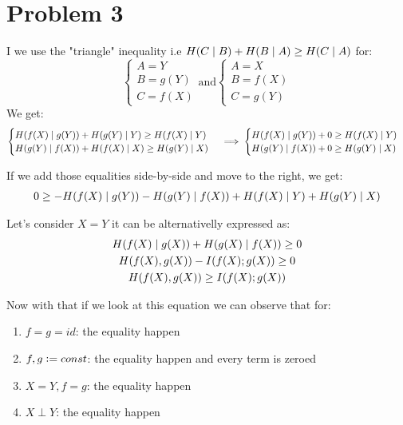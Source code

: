 

\section{Problem 3}


I we use the "triangle" inequality i.e $\pre{C}[B] + \pre{B}[A] \geq \pre{C}[A]$ for:
\begin{equation}
\begin{cases}
    A=Y\\
    B=g(Y)\\
    C=f(X)
\end{cases}
\mbox{and}
\begin{cases}
    A=X\\
    B=f(X)\\
    C=g(Y)
\end{cases}
\end{equation}
We get:
\begin{equation}
\begin{cases}
    \pre{f(X)}[g(Y)] + \pre{g(Y)}[Y] \geq \pre{f(X)}[Y] \\
    \pre{g(Y)}[f(X)] + \pre{f(X)}[X] \geq \pre{g(Y)}[X]
\end{cases}
\implies
\begin{cases}
    \pre{f(X)}[g(Y)] + 0 \geq \pre{f(X)}[Y] \\
    \pre{g(Y)}[f(X)] + 0 \geq \pre{g(Y)}[X]
\end{cases}
\end{equation}

If we add those equalities side-by-side and move to the right, we get:
\begin{align*}
0 \geq - \pre{f(X)}[g(Y)] - \pre{g(Y)}[f(X)] + \pre{f(X)}[Y] + \pre{g(Y)}[X]
\end{align*}

Let's consider $X=Y$ it can be alternativelly expressed as:
\begin{gather*}
\pre{f(X)}[g(X)] + \pre{g(X)}[f(X)] \geq 0 \\
\pre{f(X),g(X)}-\pri{f(X);g(X)} \geq 0 \\
\pre{f(X),g(X)} \geq \pri{f(X);g(X)}
\end{gather*}

Now with that if we look at this equation we can observe that for:
\begin{enumerate}
    \item $f = g = id$: the equality happen
    \item $f, g \vcentcolon= const$: the equality happen and every term is zeroed
    \item $X = Y, f = g$: the equality happen
    \item $X \perp Y$: the equality happen
\end{enumerate}

